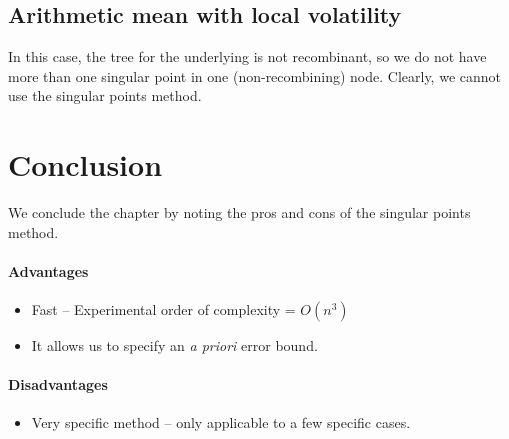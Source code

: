 \subsection{Arithmetic mean with local volatility}
\label{sec:am-local-vol}

In this case, the tree for the underlying is not recombinant, so we do not have more than one singular point in one (non-recombining) node. Clearly, we cannot use the singular points method.



\section{Conclusion}
\label{sec:sp-adv}

We conclude the chapter by noting the pros and cons of the singular points method.
\paragraph{Advantages}
\begin{itemize}
	\item Fast -- Experimental order of complexity = $ O(n^3) $
	\item It allows us to specify an \emph{a priori} error bound.
\end{itemize}


\paragraph{Disadvantages}
\begin{itemize}
	\item Very specific method -- only applicable to a few specific cases.
\end{itemize}


